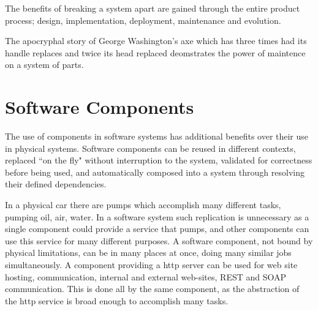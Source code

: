 \documentclass{report}
\begin{document}
The benefits of breaking a system apart are gained through the entire product process; design, implementation, deployment, maintenance and evolution.



The apocryphal story of George Washington's axe which has three times had its handle replaces and twice its head replaced deomstrates the power of maintence on a system of parts.


\section{Software Components}
{}The use of components in software systems has additional benefits over their use in physical systems.
{}Software components can be reused in different contexts, replaced ``on the fly" without interruption to the system, validated for correctness before being used, 
{}and automatically composed into a system through resolving their defined dependencies.

In a physical car there are pumps which accomplish many different tasks, pumping oil, air, water.
In a software system such replication is unnecessary as a single component could provide a service that pumps, 
and other components can use this service for many different purposes.
A software component, not bound by physical limitations, can be in many places at once, doing many similar jobs simultaneously.
A component providing a http server can be used for web site hosting, communication, internal and external web-sites, REST and SOAP communication.
This is done all by the same component, as the abstraction of the http service is broad enough to accomplish many tasks.
\end{document}

